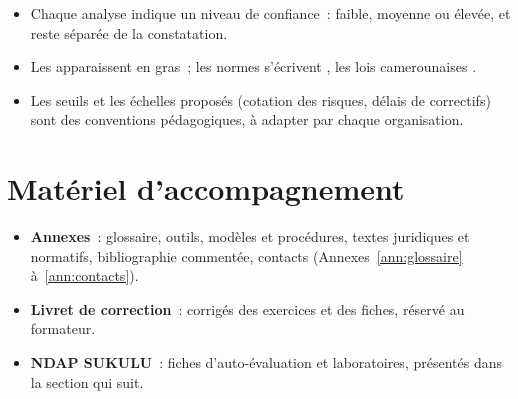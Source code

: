 \begin{itemize}
    \item Chaque analyse indique un niveau de confiance~: faible, moyenne ou
          élevée, et reste séparée de la constatation.
    \item Les  apparaissent en gras~; les normes
          s'écrivent , les lois camerounaises
          .
    \item Les seuils et les échelles proposés (cotation des risques, délais
          de correctifs) sont des conventions pédagogiques, à adapter par
          chaque organisation.
\end{itemize}

\section*{Matériel d'accompagnement}

\begin{itemize}
    \item \textbf{Annexes}~: glossaire, outils, modèles et procédures,
          textes juridiques et normatifs, bibliographie commentée, contacts
          (Annexes~\ref{ann:glossaire} à~\ref{ann:contacts}).
    \item \textbf{Livret de correction}~: corrigés des exercices et des
          fiches, réservé au formateur.
    \item \textbf{NDAP SUKULU}~: fiches d'auto-évaluation et laboratoires,
          présentés dans la section qui suit.
\end{itemize}
